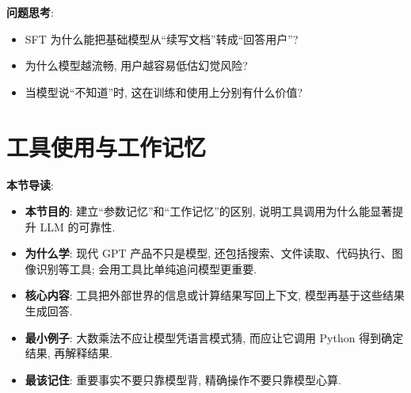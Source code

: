 \documentclass{../nndlcourse}
\begin{document}
\textbf{问题思考}:
\begin{itemize}
  \item SFT 为什么能把基础模型从“续写文档”转成“回答用户”?
  \item 为什么模型越流畅, 用户越容易低估幻觉风险?
  \item 当模型说“不知道”时, 这在训练和使用上分别有什么价值?
\end{itemize}

\section{工具使用与工作记忆}

\textbf{本节导读}:
\begin{itemize}
  \item \textbf{本节目的}: 建立“参数记忆”和“工作记忆”的区别, 说明工具调用为什么能显著提升 LLM 的可靠性.
  \item \textbf{为什么学}: 现代 GPT 产品不只是模型, 还包括搜索、文件读取、代码执行、图像识别等工具; 会用工具比单纯追问模型更重要.
  \item \textbf{核心内容}: 工具把外部世界的信息或计算结果写回上下文, 模型再基于这些结果生成回答.
  \item \textbf{最小例子}: 大数乘法不应让模型凭语言模式猜, 而应让它调用 Python 得到确定结果, 再解释结果.
  \item \textbf{最该记住}: 重要事实不要只靠模型背, 精确操作不要只靠模型心算.
\end{itemize}
\end{document}
